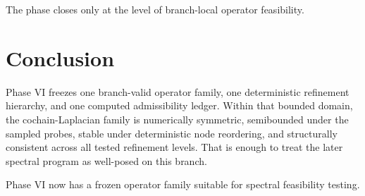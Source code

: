\documentclass[11pt]{article}
\begin{document}
The phase closes only at the level of branch-local operator feasibility.

\section{Conclusion}

Phase VI freezes one branch-valid operator family, one deterministic refinement hierarchy, and one computed admissibility ledger. Within that bounded domain, the cochain-Laplacian family is numerically symmetric, semibounded under the sampled probes, stable under deterministic node reordering, and structurally consistent across all tested refinement levels. That is enough to treat the later spectral program as well-posed on this branch.

Phase VI now has a frozen operator family suitable for spectral feasibility testing.
\end{document}
